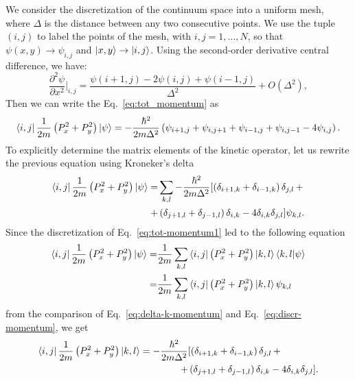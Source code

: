 We consider the discretization of the continuum space into a uniform mesh, where $\Delta$ is the distance between any two consecutive points. We use the tuple $(i,j)$ to label the points of the mesh, with $i,j = 1,\ldots , N$, so that $\psi(x,y) \rightarrow \psi_{i,j}$ and $\ket{x,y} \rightarrow \ket{i,j}$. Using the second-order derivative central difference, we have:
\begin{equation} \label{eq:second-order-derivative}
\frac{\partial^2 \psi}{\partial x^2} \bigg|_{i,j} = \frac{\psi(i+1,j) - 2 \psi(i,j) + \psi(i-1,j)}{\Delta^2} + O(\Delta^2),
\end{equation}
Then we can write the Eq.~\eqref{eq:tot_momentum} as
\begin{equation} 
\bra{i,j} \frac{1}{2m} \left( P_x^2 + P_y^2 \right) \ket{\psi} = -\frac{\hbar^2}{2m\Delta^2} \left( \psi_{i+1,j} + \psi_{i,j+1} + \psi_{i-1,j} + \psi_{i,j-1} - 4 \psi_{i,j} \right). \nonumber
\end{equation}
To explicitly determine the matrix elements of the kinetic operator, let us rewrite the previous equation using Kroneker's delta
\begin{align} \label{eq:delta-k-momentum}
\bra{i,j} \frac{1}{2m} \left( P_x^2 + P_y^2 \right) \ket{\psi} = & \sum_{k,l} -\frac{\hbar^2}{2m\Delta^2} [ \left(  \delta_{i+1,k} + \delta_{i-1,k} \right) \delta_{j,l} \, +  \\ 
+ &  \left( \delta_{j+1,l} + \delta_{j-1,l} \right) \delta_{i,k} - 4 \delta_{i,k} \delta_{j,l} ] \psi_{k,l}. \nonumber
\end{align}
Since the discretization of Eq.~\eqref{eq:tot-momentum1} led to the following equation
\begin{subequations}
\begin{align}
\bra{i,j} \frac{1}{2m} \left( P_x^2 + P_y^2 \right) \ket{\psi} = & \frac{1}{2m} \sum_{k,l} \bra{i,j} \left( P_x^2 + P_y^2 \right) \ket{k,l} \braket{k,l|\psi} \\
= & \frac{1}{2m} \sum_{k,l} \bra{i,j} \left( P_x^2 + P_y^2 \right) \ket{k,l} \psi_{k,l} \label{eq:discr-momentum}
\end{align}
\end{subequations}
from the comparison of Eq.~\eqref{eq:delta-k-momentum} and Eq.~\eqref{eq:discr-momentum}, we get
\begin{align} \label{eq:delta-kroneker}
\bra{i,j} \frac{1}{2m} \left( P_x^2 + P_y^2 \right) \ket{k,l} = -\frac{\hbar^2}{2m\Delta^2} & [ \left( \delta_{i+1,k} + \delta_{i-1,k} \right) \delta_{j,l} \, + \\ + & \left( \delta_{j+1,l} + \delta_{j-1,l} \right) \delta_{i,k} - 4 \delta_{i,k} \delta_{j,l} ]. \nonumber
\end{align}


